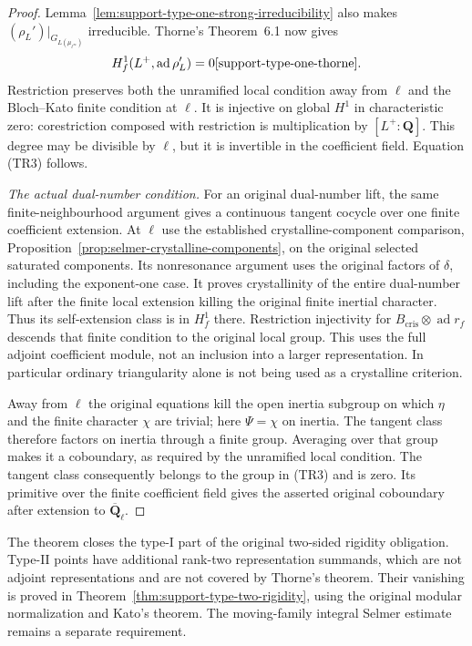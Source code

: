 \begin{proof}
Lemma~\ref{lem:support-type-one-strong-irreducibility} also makes
$(\rho_L')|_{G_{L(\mu_{\ell^\infty})}}$ irreducible.  Thorne's
Theorem~6.1 now gives
\[
             H_f^1(L^+,\operatorname{ad}\rho_L')=0
                                      \cite{support-type-one-thorne}.
\]
Restriction preserves both the unramified local condition away from
$\ell$ and the Bloch--Kato finite condition at $\ell$.  It is
injective on global $H^1$ in characteristic zero: corestriction
composed with restriction is multiplication by $[L^+:\mathbf Q]$.
This degree may be divisible by $\ell$, but it is invertible in the
coefficient field.  Equation (TR3) follows.

\emph{The actual dual-number condition.}
For an original dual-number lift, the same finite-neighbourhood
argument gives a continuous tangent cocycle over one finite
coefficient extension.  At $\ell$ use the established
crystalline-component comparison,
Proposition~\ref{prop:selmer-crystalline-components}, on the
original selected saturated components.  Its nonresonance argument
uses the original factors of $\delta$, including the exponent-one
case.  It proves crystallinity of the entire dual-number lift after
the finite local extension killing the original finite inertial
character.  Thus its self-extension class is in $H_f^1$ there.
Restriction injectivity for
$B_{\mathrm{cris}}\otimes\operatorname{ad}r_f$ descends that finite
condition to the original local group.  This uses the full adjoint
coefficient module, not an inclusion into a larger representation.
In particular ordinary triangularity alone is not being used as a
crystalline criterion.

Away from $\ell$ the original equations kill the open inertia
subgroup on which $\eta$ and the finite character $\chi$ are trivial;
here $\Psi=\chi$ on inertia.
The tangent class therefore factors on inertia through a finite
group.  Averaging over that group makes it a coboundary, as required
by the unramified local condition.  The tangent class consequently
belongs to the group in (TR3) and is zero.  Its primitive over the
finite coefficient field gives the asserted original coboundary
after extension to $\overline{\mathbf Q}_\ell$.
\end{proof}

The theorem closes the type-I part of the original two-sided rigidity
obligation.  Type-II points have additional rank-two representation
summands, which are not adjoint representations and are not covered by
Thorne's theorem.  Their vanishing is proved in
Theorem~\ref{thm:support-type-two-rigidity}, using the original modular
normalization and Kato's theorem.  The moving-family integral
Selmer estimate remains a separate requirement.
